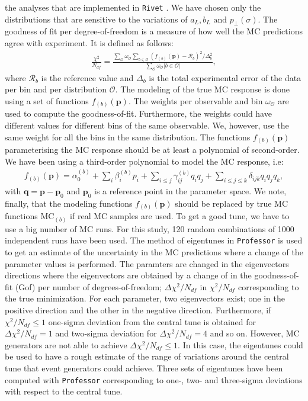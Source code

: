 \documentclass[aps,preprint,floatfix,nofootinbib,showpacs]{revtex4-1}
\begin{document}
the analyses that are implemented in \texttt{Rivet} \cite{Buckley:2010ar}. 
We have chosen only the distributions that are sensitive to the variations 
of $a_L, b_L \text{ and } p_\perp(\sigma)$. The goodness of fit per 
degree-of-freedom is a measure of how well the MC predictions agree
with experiment. It is defined as follows:
\begin{eqnarray}
 \frac{\chi^2}{N_{df}} = \frac{\sum_{\mathcal{O}} 
 \omega_\mathcal{O} \sum_{b\in \mathcal{O}} (f_{(b)}(\textbf{p}) - \mathcal{R}_b)^2/\Delta_b^2}{\sum_{\mathcal{O}} \omega_\mathcal{O} |b \in \mathcal{O}|},
\label{Gof-Ndf}
 \end{eqnarray}
where $\mathcal{R}_b$ is the reference value and $\Delta_b$ 
is the total experimental error of the data per bin and per 
distribution $\mathcal{O}$. The modeling of the true MC response 
is done using a set of functions $f_{(b)}(\textbf{p})$. The weights
per observable and bin $\omega_\mathcal{O}$ are used to compute the 
goodness-of-fit. Furthermore, the weights could have different values 
for different bins of the same observable. We, however, use the same 
weight for all the bins in the same distribution. 
The functions $f_{(b)}(\textbf{p})$
parameterising the MC response should be at least a polynomial of second-order.
We have been using a third-order polynomial to model the MC response, i.e:
\begin{eqnarray}
 f_{(b)}(\textbf{p}) = \alpha_0^{(b)} + \sum_i \beta_i^{(b)} p_i + \sum_{i \leq j} \gamma_{ij}^{(b)} q_i q_j +
 \sum_{i\leq j \leq k} \delta_{ijk} q_i q_j q_k,
 \label{MC-response}
\end{eqnarray}
with $\textbf{q} = \textbf{p} - \textbf{p}_0$ and $\textbf{p}_0$ is a reference point in the 
parameter space. We note, finally, that the modeling functions $f_{(b)}(\textbf{p})$ 
should be replaced by true MC functions $\text{MC}_{(b)}$ if real MC samples are used.
To get a good tune, we have to use a big number of MC runs. 
For this study, 120 random combinations
of 1000 independent runs have been used. 
The method of eigentunes in \texttt{Professor} is used to get an estimate of the 
uncertainty in the MC predictions where a change of the parameter values is 
performed. The paramters are changed in the eigenvectors directions where the 
eigenvectors are obtained by a change of in the goodness-of-fit (Gof) 
per number of degrees-of-freedom; 
$\Delta \chi^2/N_{df}$ in $\chi^2/N_{df}$ corresponding to the true minimization. 
For each parameter, two eigenvectors exist; one in the positive direction and the other 
in the negative direction. Furthermore, if $\chi^2/N_{df} \leq 1$ one-sigma deviation 
from the central tune is obtained for $\Delta \chi^2/N_{df} = 1$ and two-sigma deviation
for $\Delta \chi^2/N_{df} = 4$ and so on.
However, MC generators are not able to achieve $\Delta \chi^2/N_{df} \leq 1$. In this case,
the eigentunes could be used to have a rough estimate of the range of variations around
the central tune that event generators could achieve. Three sets of eigentunes have 
been computed with \texttt{Professor} corresponding to one-, two- and three-sigma deviations with 
respect to the central tune.
\end{document}
